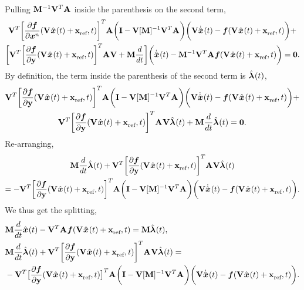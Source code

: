 \documentclass[3p,computermodern,10pt]{elsarticle}
\begin{document}
\begin{appendices}
\begin{multline*}
\end{multline*}
Pulling $\mathbf{M}^{-1} \mathbf {V}^T \mathbf{A}^{}$ inside the parenthesis on the second term,
\begin{multline*}
\mathbf {V}^T \bigg[\frac{\partial \boldsymbol f}{\partial \boldsymbol x^n}(\mathbf {V}^{} \hat{ \boldsymbol x}^{}(t) + \mathbf{x}_\text{ref}^{},t) \bigg]^T \mathbf{A}^{}\bigg( \mathbf{I} - \mathbf {V}[\mathbf{M}]^{-1} \mathbf {V}^T \mathbf{A}^{} \bigg)  \bigg(  \mathbf {V} \dot{\hat{ \boldsymbol x}}^{}(t)   -  \boldsymbol f(\mathbf {V}^{} \hat{ \boldsymbol x}^{}(t) + \mathbf{x}_\text{ref}^{},t) \bigg)  + \\  
\bigg[ \mathbf {V}^T \bigg[\frac{\partial \boldsymbol f}{\partial \mathbf{y}}(\mathbf {V}^{} \hat{ \boldsymbol x}^{}(t) + \mathbf{x}_\text{ref}^{},t) \bigg]^T \mathbf{A}^{} \mathbf {V}  +   \mathbf{M} \frac{d}{dt} \bigg] \bigg( \dot{\hat{ \boldsymbol x}}^{}(t)  - \mathbf{M}^{-1} \mathbf {V}^T \mathbf{A}^{}  \boldsymbol f(\mathbf {V}^{} \hat{ \boldsymbol x}^{}(t) + \mathbf{x}_\text{ref}^{},t) \bigg) = \boldsymbol 0.
\end{multline*}
By definition, the term inside the parenthesis of the second term is $\hat{\boldsymbol \lambda}^{}(t)$,
\begin{multline*}
\mathbf {V}^T \bigg[\frac{\partial \boldsymbol f}{\partial \mathbf{y}}(\mathbf {V}^{} \hat{ \boldsymbol x}^{}(t) + \mathbf{x}_\text{ref}^{},t) \bigg]^T \mathbf{A}^{}\bigg( \mathbf{I} - \mathbf {V} [\mathbf{M}]^{-1} \mathbf {V}^T \mathbf{A}^{} \bigg)  \bigg(  \mathbf {V} \dot{\hat{ \boldsymbol x}}^{}(t)    -  \boldsymbol f(\mathbf {V}^{} \hat{ \boldsymbol x}^{}(t) + \mathbf{x}_\text{ref}^{},t) \bigg)  +   \\ \mathbf {V}^T \bigg[\frac{\partial \boldsymbol f}{\partial \mathbf{y}}(\mathbf {V}^{} \hat{ \boldsymbol x}^{}(t) + \mathbf{x}_\text{ref}^{},t) \bigg]^T \mathbf{A}^{} \mathbf {V} \hat{\boldsymbol \lambda}^{}(t)  +  \mathbf{M} \frac{d}{dt} \hat{\boldsymbol \lambda}^{}(t)= \boldsymbol 0.
\end{multline*}
Re-arranging,
\begin{multline*}
\mathbf{M} \frac{d }{dt}\hat{\boldsymbol \lambda}^{}(t) + \mathbf {V}^T \bigg[\frac{\partial \boldsymbol f}{\partial \mathbf{y}} ( \mathbf {V}^{} \hat{ \boldsymbol x}^{}(t) + \mathbf{x}_\text{ref}^{},t ) \bigg]^T \mathbf{A}^{} \mathbf {V}  \hat{\boldsymbol \lambda}^{}(t)  \\
= - \mathbf {V}^T \bigg[\frac{\partial \boldsymbol f}{\partial \mathbf{y}}(\mathbf {V}^{} \hat{ \boldsymbol x}^{}(t) + \mathbf{x}_\text{ref}^{},t)\bigg]^T \mathbf{A}^{}\bigg( \mathbf{I} - \mathbf {V} [\mathbf{M}]^{-1} \mathbf {V}^T \mathbf{A}^{} \bigg)  \bigg(  \mathbf {V} \dot{\hat{ \boldsymbol x}}^{}(t)   -  \boldsymbol f(\mathbf {V}^{} \hat{ \boldsymbol x}^{}(t) + \mathbf{x}_\text{ref}^{},t) \bigg).
\end{multline*}
We thus get the splitting,
\begin{align*}\label{eq:lspg_continuous_appendix}
& \mathbf{M} \frac{d}{dt}\hat{ \boldsymbol x}^{}(t)  -  \mathbf {V}^T \mathbf{A}^{} \boldsymbol f(\mathbf {V}^{} \hat{ \boldsymbol x}^{}(t) + \mathbf{x}_\text{ref}^{},t) =  \mathbf{M} \hat{\boldsymbol \lambda}^{}(t),\\
&\mathbf{M} \frac{d}{dt} \hat{\boldsymbol \lambda}^{}(t)  + \mathbf {V}^T \bigg[\frac{\partial \boldsymbol f}{\partial \mathbf{y}} (\mathbf {V}^{} \hat{ \boldsymbol x}^{}(t) + \mathbf{x}_\text{ref}^{},t) \bigg]^T \mathbf{A}^{} \mathbf {V} \hat{\boldsymbol \lambda}^{}(t) = \\
& -\mathbf {V}^T \big[ \frac{\partial \boldsymbol f}{\partial \mathbf{y}}(\mathbf {V}^{} \hat{ \boldsymbol x}^{}(t) + \mathbf{x}_\text{ref}^{},t) \big] ^T \mathbf{A}^{}  \bigg( \mathbf{I} -   \mathbf {V} [\mathbf{M}]^{-1} \mathbf {V}^T   \mathbf{A}^{} \bigg)\bigg( \mathbf {V} \dot{\hat{ \boldsymbol x}}^{}(t)   -   \boldsymbol f(\mathbf {V}^{} \hat{ \boldsymbol x}^{}(t) + \mathbf{x}_\text{ref}^{},t) \bigg) . 
\end{align*}

\end{appendices}
\end{document}
